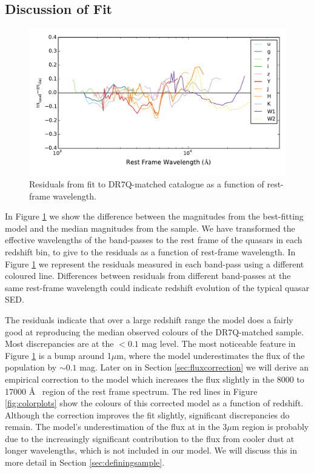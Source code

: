 \subsection{Discussion of Fit}

\begin{figure}
  \centering
  \includegraphics[width=\textwidth]{figures/chapter06/residuals_nocorr}
  \caption{Residuals from fit to DR7Q-matched catalogue as a function of rest-frame wavelength.}
  \label{fig:residuals}
\end{figure}

In Figure \ref{fig:residuals} we show the difference between the magnitudes from the best-fitting model and the median magnitudes from the sample. We have transformed the effective wavelengths of the band-passes to the rest frame of the quasars in each redshift bin, to give to the residuals as a function of rest-frame wavelength. In Figure \ref{fig:residuals} we represent the residuals measured in each band-pass using a different coloured line. Differences between residuals from different band-passes at the same rest-frame wavelength could indicate redshift evolution of the typical quasar SED. 

The residuals indicate that over a large redshift range the model does a fairly good at reproducing the median observed colours of the DR7Q-matched sample. Most discrepancies are at the $<0.1$ mag level. The most noticeable feature in Figure \ref{fig:residuals} is a bump around 1$\mu$m, where the model underestimates the flux of the population by $\sim 0.1$ mag. Later on in Section \ref{sec:fluxcorrection} we will derive an empirical correction to the model which increases the flux slightly in the 8000 to 17000 \AA~ region of the rest frame spectrum. The red lines in Figure \ref{fig:colorplots} show the colours of this corrected model as a function of redshift. Although the correction improves the fit slightly, significant discrepancies do remain. The model's underestimation of the flux at in the 3$\mu$m region is probably due to the increasingly significant contribution to the flux from cooler dust at longer wavelengths, which is not included in our model. We will discuss this in more detail in Section \ref{sec:definingsample}. 

